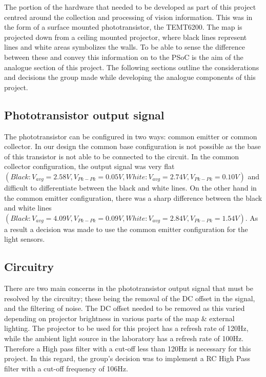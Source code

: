 \documentclass{article}
\begin{document}
The portion of the hardware that needed to be developed as part of this project centred around the collection and processing of vision information. This was in the form of a surface mounted phototransistor, the TEMT6200. The map is projected down from a ceiling mounted projector, where black lines represent lines and white areas symbolizes the walls. To be able to sense the difference between these and convey this information on to the PSoC is the aim of the analogue section of this project. The following sections outline the considerations and decisions the group made while developing the analogue components of this project.

\subsection{Phototransistor output signal}

The phototransistor can be configured in two ways: common emitter or common collector. In our design the common base configuration is not possible as the base of this transistor is not able to be connected to the circuit. In the common collector configuration, the output signal was very flat $(Black: V_{avg} = 2.58V, V_{Pk-Pk} = 0.05V, White: V_{avg} = 2.74V, V_{Pk-Pk} = 0.10V)$ and difficult to differentiate between the black and white lines. On the other hand in the common emitter configuration, there was a sharp difference between the black and white lines $(Black: V_{avg} = 4.09V, V_{Pk-Pk} = 0.09V, White: V_{avg} = 2.84V, V_{Pk-Pk} = 1.54V)$. As a result a decision was made to use the common emitter configuration for the light sensors.

\subsection{Circuitry}

There are two main concerns in the phototransistor output signal that must be resolved by the circuitry; these being the removal of the DC offset in the signal, and the filtering of noise. The DC offset needed to be removed as this varied depending on projector brightness in various parts of the map \& external lighting. The projector to be used for this project has a refresh rate of 120Hz, while the ambient light source in the laboratory has a refresh rate of 100Hz. Therefore a High pass filter with a cut-off less than 120Hz is necessary for this project. In this regard, the group's decision was to implement a RC High Pass filter with a cut-off frequency of 106Hz.
\end{document}
